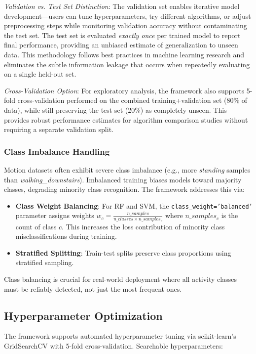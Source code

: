 \textit{Validation vs. Test Set Distinction}: The validation set enables iterative model development—users can tune hyperparameters, try different algorithms, or adjust preprocessing steps while monitoring validation accuracy without contaminating the test set. The test set is evaluated \textit{exactly once} per trained model to report final performance, providing an unbiased estimate of generalization to unseen data. This methodology follows best practices in machine learning research \cite{goodfellow2016deep} and eliminates the subtle information leakage that occurs when repeatedly evaluating on a single held-out set.

\textit{Cross-Validation Option}: For exploratory analysis, the framework also supports 5-fold cross-validation performed on the combined training+validation set (80\% of data), while still preserving the test set (20\%) as completely unseen. This provides robust performance estimates for algorithm comparison studies without requiring a separate validation split.

\subsubsection{Class Imbalance Handling}
Motion datasets often exhibit severe class imbalance (e.g., more \textit{standing} samples than \textit{walking\_downstairs}). Imbalanced training biases models toward majority classes, degrading minority class recognition. The framework addresses this via:
\begin{itemize}
    \item \textbf{Class Weight Balancing}: For RF and SVM, the \texttt{class\_weight='balanced'} parameter assigns weights $w_c = \frac{n\_samples}{n\_classes \times n\_samples_c}$ where $n\_samples_c$ is the count of class $c$. This increases the loss contribution of minority class misclassifications during training.
    \item \textbf{Stratified Splitting}: Train-test splits preserve class proportions using stratified sampling.
\end{itemize}
Class balancing is crucial for real-world deployment where all activity classes must be reliably detected, not just the most frequent ones.

\subsection{Hyperparameter Optimization}
The framework supports automated hyperparameter tuning via scikit-learn's GridSearchCV with 5-fold cross-validation. Searchable hyperparameters:

